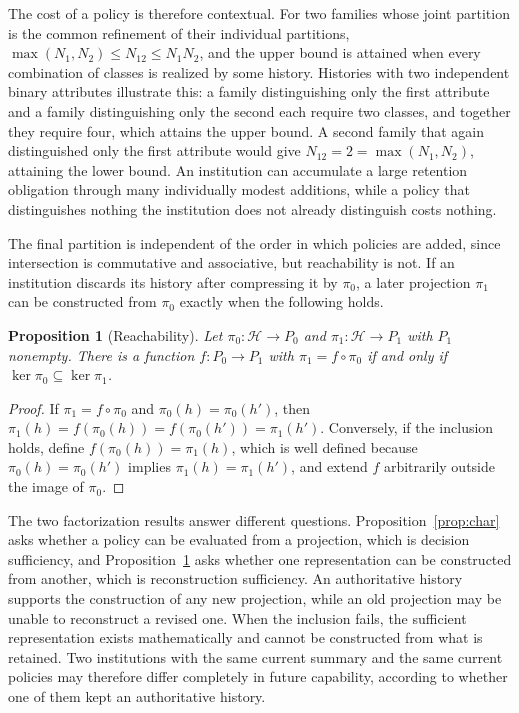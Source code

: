 \documentclass[11pt]{article}
\newtheorem{proposition}{Proposition}
\theoremstyle{remark}
\newcommand{\Hist}{\mathcal{H}}
\renewcommand{\ker}{\operatorname{ker}}
\begin{document}
The cost of a policy is therefore contextual. For two families whose joint partition is the common refinement of their individual partitions, $\max(N_1,N_2)\le N_{12}\le N_1N_2$, and the upper bound is attained when every combination of classes is realized by some history. Histories with two independent binary attributes illustrate this: a family distinguishing only the first attribute and a family distinguishing only the second each require two classes, and together they require four, which attains the upper bound. A second family that again distinguished only the first attribute would give $N_{12}=2=\max(N_1,N_2)$, attaining the lower bound. An institution can accumulate a large retention obligation through many individually modest additions, while a policy that distinguishes nothing the institution does not already distinguish costs nothing.

The final partition is independent of the order in which policies are added, since intersection is commutative and associative, but reachability is not. If an institution discards its history after compressing it by $\pi_0$, a later projection $\pi_1$ can be constructed from $\pi_0$ exactly when the following holds.

\begin{proposition}[Reachability]\label{prop:reach}
Let $\pi_0:\Hist\to P_0$ and $\pi_1:\Hist\to P_1$ with $P_1$ nonempty. There is a function $f:P_0\to P_1$ with $\pi_1=f\circ\pi_0$ if and only if $\ker\pi_0\subseteq\ker\pi_1$.
\end{proposition}

\begin{proof}
If $\pi_1=f\circ\pi_0$ and $\pi_0(h)=\pi_0(h')$, then $\pi_1(h)=f(\pi_0(h))=f(\pi_0(h'))=\pi_1(h')$. Conversely, if the inclusion holds, define $f(\pi_0(h))=\pi_1(h)$, which is well defined because $\pi_0(h)=\pi_0(h')$ implies $\pi_1(h)=\pi_1(h')$, and extend $f$ arbitrarily outside the image of $\pi_0$.
\end{proof}

The two factorization results answer different questions. Proposition~\ref{prop:char} asks whether a policy can be evaluated from a projection, which is decision sufficiency, and Proposition~\ref{prop:reach} asks whether one representation can be constructed from another, which is reconstruction sufficiency. An authoritative history supports the construction of any new projection, while an old projection may be unable to reconstruct a revised one. When the inclusion fails, the sufficient representation exists mathematically and cannot be constructed from what is retained. Two institutions with the same current summary and the same current policies may therefore differ completely in future capability, according to whether one of them kept an authoritative history.
\end{document}
